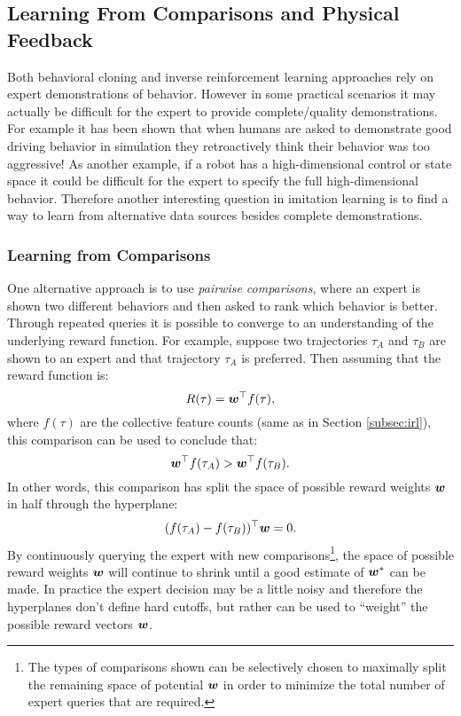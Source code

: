 \subsection{Learning From Comparisons and Physical Feedback}
Both behavioral cloning and inverse reinforcement learning approaches rely on expert demonstrations of behavior. However in some practical scenarios it may actually be difficult for the expert to provide complete/quality demonstrations. For example it has been shown\cite{BasuYangEtAl2017} that when humans are asked to demonstrate good driving behavior in simulation they retroactively think their behavior was too aggressive! As another example, if a robot has a high-dimensional control or state space it could be difficult for the expert to specify the full high-dimensional behavior. Therefore another interesting question in imitation learning is to find a way to learn from alternative data sources besides complete demonstrations.

\subsubsection{Learning from Comparisons}
One alternative approach is to use \textit{pairwise comparisons}\cite{SadighDraganEtAl2017}, where an expert is shown two different behaviors and then asked to rank which behavior is better. Through repeated queries it is possible to converge to an understanding of the underlying reward function. For example, suppose two trajectories $\tau_A$ and $\tau_B$ are shown to an expert and that trajectory $\tau_A$ is preferred. Then assuming that the reward function is:
\begin{equation*}
R(\tau) = \bm{w}^\top  f(\tau),
\end{equation*}
where $f(\tau)$ are the collective feature counts (same as in Section \ref{subsec:irl}), this comparison can be used to conclude that:
\begin{equation*}
\bm{w}^\top  f(\tau_A) > \bm{w}^\top  f(\tau_B).
\end{equation*}
In other words, this comparison has split the space of possible reward weights $\bm{w}$ in half through the hyperplane:
\begin{equation*}
(f(\tau_A) - f(\tau_B))^\top  \bm{w} = 0.
\end{equation*}
By continuously querying the expert with new comparisons\footnote{The types of comparisons shown can be selectively chosen to maximally split the remaining space of potential $\bm{w}$ in order to minimize the total number of expert queries that are required.}, the space of possible reward weights $\bm{w}$ will continue to shrink until a good estimate of $\bm{w}^*$ can be made. In practice the expert decision may be a little noisy and therefore the hyperplanes don't define hard cutoffs, but rather can be used to ``weight'' the possible reward vectors $\bm{w}$.

